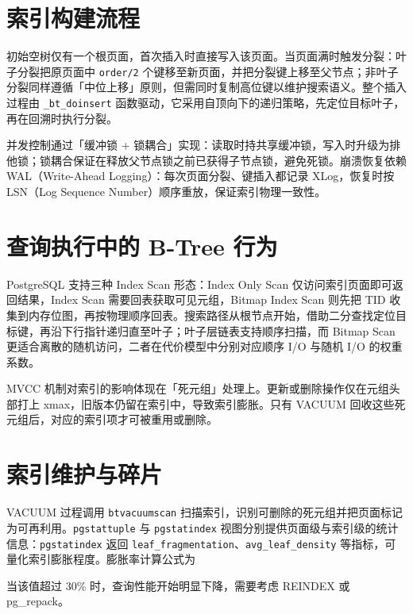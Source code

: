 \chapter{索引构建流程}
初始空树仅有一个根页面，首次插入时直接写入该页面。当页面满时触发分裂：叶子分裂把原页面中 \texttt{order/2} 个键移至新页面，并把分裂键上移至父节点；非叶子分裂同样遵循「中位上移」原则，但需同时复制高位键以维护搜索语义。整个插入过程由 \texttt{\_{}bt\_{}doinsert} 函数驱动，它采用自顶向下的递归策略，先定位目标叶子，再在回溯时执行分裂。\par
并发控制通过「缓冲锁 + 锁耦合」实现：读取时持共享缓冲锁，写入时升级为排他锁；锁耦合保证在释放父节点锁之前已获得子节点锁，避免死锁。崩溃恢复依赖 WAL（Write-Ahead Logging）：每次页面分裂、键插入都记录 XLog，恢复时按 LSN（Log Sequence Number）顺序重放，保证索引物理一致性。\par
\chapter{查询执行中的 B-Tree 行为}
PostgreSQL 支持三种 Index Scan 形态：Index Only Scan 仅访问索引页面即可返回结果，Index Scan 需要回表获取可见元组，Bitmap Index Scan 则先把 TID 收集到内存位图，再按物理顺序回表。搜索路径从根节点开始，借助二分查找定位目标键，再沿下行指针递归直至叶子；叶子层链表支持顺序扫描，而 Bitmap Scan 更适合离散的随机访问，二者在代价模型中分别对应顺序 I/O 与随机 I/O 的权重系数。\par
MVCC 机制对索引的影响体现在「死元组」处理上。更新或删除操作仅在元组头部打上 xmax，旧版本仍留在索引中，导致索引膨胀。只有 VACUUM 回收这些死元组后，对应的索引项才可被重用或删除。\par
\chapter{索引维护与碎片}
VACUUM 过程调用 \texttt{btvacuumscan} 扫描索引，识别可删除的死元组并把页面标记为可再利用。\texttt{pgstattuple} 与 \texttt{pgstatindex} 视图分别提供页面级与索引级的统计信息：\texttt{pgstatindex} 返回 \texttt{leaf\_{}fragmentation}、\texttt{avg\_{}leaf\_{}density} 等指标，可量化索引膨胀程度。膨胀率计算公式为\par
[
\textbackslash{}text\{{}bloat\_{}ratio\}{} = 1 - \textbackslash{}frac\{{}\textbackslash{}text\{{}logical\_{}size\}{}\}{}\{{}\textbackslash{}text\{{}physical\_{}size\}{}\}{}
]\par
当该值超过 30\%{} 时，查询性能开始明显下降，需要考虑 REINDEX 或 pg\_{}repack。\par
